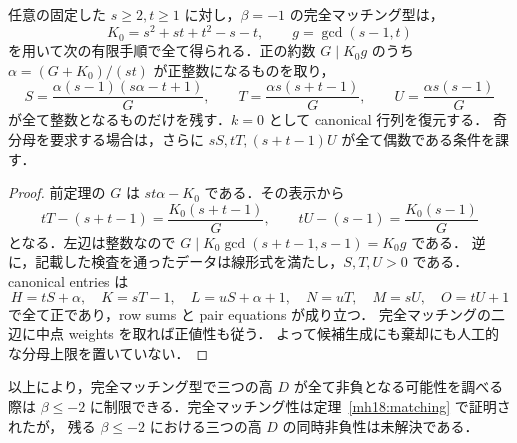 \begin{corollary}[$\beta=-1$ の全整数模型を与える有限な約数手順]
\label{sm14:beta-boundary-factorization}
任意の固定した $s\geq2,t\geq1$ に対し，$\beta=-1$ の完全マッチング型は，
\[
 K_0=s^2+st+t^2-s-t,\qquad g=\gcd(s-1,t)
\]
を用いて次の有限手順で全て得られる．正の約数 $G\mid K_0g$ のうち
$\alpha=(G+K_0)/(st)$ が正整数になるものを取り，
\[
 S=\frac{\alpha(s-1)(s\alpha-t+1)}G,\qquad
 T=\frac{\alpha s(s+t-1)}G,\qquad
 U=\frac{\alpha s(s-1)}G
\]
が全て整数となるものだけを残す．$k=0$ として canonical 行列を復元する．
奇分母を要求する場合は，さらに $sS,tT,(s+t-1)U$ が全て偶数である条件を課す．
\end{corollary}

\begin{proof}
前定理の $G$ は $st\alpha-K_0$ である．その表示から
\[
 tT-(s+t-1)=\frac{K_0(s+t-1)}G,
 \qquad tU-(s-1)=\frac{K_0(s-1)}G
\]
となる．左辺は整数なので
$G\mid K_0\gcd(s+t-1,s-1)=K_0g$ である．
逆に，記載した検査を通ったデータは線形式を満たし，$S,T,U>0$ である．
canonical entries は
\[
 H=tS+\alpha,\quad K=sT-1,\quad
 L=uS+\alpha+1,\quad N=uT,\quad M=sU,\quad O=tU+1
\]
で全て正であり，row sums と pair equations が成り立つ．
完全マッチングの二辺に中点 weights を取れば正値性も従う．
よって候補生成にも棄却にも人工的な分母上限を置いていない．
\end{proof}

以上により，完全マッチング型で三つの高 $D$ が全て非負となる可能性を調べる際は
$\beta\leq-2$ に制限できる．完全マッチング性は定理~\ref{mh18:matching} で証明されたが，
残る $\beta\leq-2$ における三つの高 $D$ の同時非負性は未解決である．
